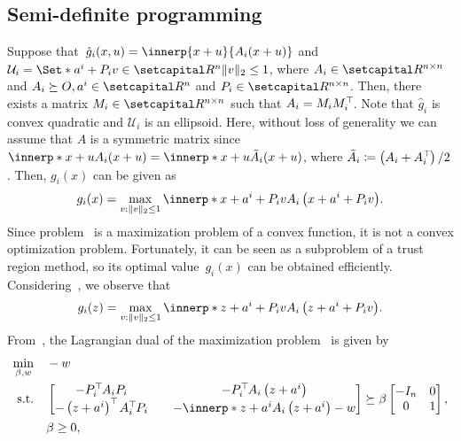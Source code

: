 \documentclass[../../main]{subfiles}
\begin{document}
\subsection{Semi-definite programming} 
Suppose that~$\hat{g}_i (x,u) = \innerp{x + u}{A_i (x + u)}$ and ${\mathcal{U}}_i = \Set*{ a^i + P_i v \in \setR^n }{\norm{v}_2 \leq 1 }$, where $A_i \in \setR^{n \times n}$ and $A_i \succeq O, a^i \in \setR^n$ and $P_i \in \setR^{n \times n}$. 
Then, there exists a matrix $M_i \in \setR^{n \times n}$ such that $A_i = M_i M_i^\top\hspace{-1pt}$. 
Note that $\hat{g}_i$ is convex quadratic and $\mathcal{U}_i$ is an ellipsoid. 
Here, without loss of generality we can assume that $A$ is a symmetric matrix since $\innerp*{x + u}{A_i (x + u)} = \innerp*{x + u}{\tilde{A}_i (x + u)}$, where $\tilde{A}_i \coloneqq \left(A_i+A_i^\top\hspace{-1pt}\right) / 2$. Then, $g_i(x)$ can be given as
\begin{equation} \label{eq:sdp_g_i}
    g_i(x) = \max_{v : \norm{v}_2 \leq 1} \innerp*{x + a^i + P_i v}{A_i \left(x + a^i + P_i v\right)}.
\end{equation}
Since problem~ is a maximization problem of a convex function, it is not a convex optimization problem. Fortunately, it can be seen as a subproblem of a trust region method, so its optimal value~$g_i(x)$ can be obtained efficiently. Considering~, we observe that
\begin{equation} \label{eq:sdp_g_i_}
    g_i(z) = \max_{v : \norm{v}_2 \leq 1} \innerp*{z + a^i + P_i v}{A_i \left(z + a^i + P_i v\right)}.
\end{equation}
From~\cite[Section~3]{Beck2006}, the Lagrangian dual of the maximization problem~ is given by
\begin{equation}\label{eq:dual}
    \begin{aligned} 
        \min_{\beta, w} \quad   & -w \\ 
        \st    \quad   & 
        \begin{bmatrix}
            -P_i^\T A_i P_i &\quad -P_i^\T A_i \left(z + a^i\right) \\
            -\left(z + a^i\right)^\T A_i^\T P_i &\quad -\innerp*{z + a^i}{A_i \left(z + a^i\right)} - w
        \end{bmatrix}
        \succeq
        \beta \begin{bmatrix}
            -I_n & 0 \\
            0 & 1
        \end{bmatrix}, \\
                       & \beta \geq 0,
    \end{aligned}
\end{equation}
\end{document}
